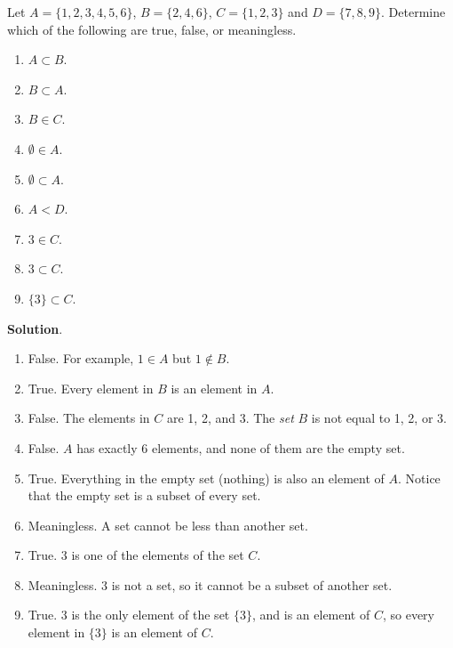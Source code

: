 \documentclass[11pt,]{book}
\theoremstyle{ptxplainnotitle}
\theoremstyle{ptxplaintitle}
\theoremstyle{ptxdefinitionnotitle}
\theoremstyle{ptxdefinitiontitle}
\theoremstyle{ptxdefinitionnotitle}
\theoremstyle{ptxdefinitiontitle}
\theoremstyle{ptxdefinitionnotitle}
\theoremstyle{ptxdefinitiontitle}
\theoremstyle{ptxdefinitiontitlenonumber}
\theoremstyle{ptxdefinitiontitlenonumber}
\numberwithin{equation}{chapter}
\newcommand{\lt}{<}
\begin{document}
\begin{example}\label{example-29}
\hypertarget{p-710}{}%
Let \(A = \{1, 2, 3, 4, 5, 6\}\), \(B = \{2, 4, 6\}\), \(C = \{1, 2, 3\}\) and \(D = \{7, 8, 9\}\). Determine which of the following are true, false, or meaningless.%
\par
\hypertarget{p-711}{}%
\leavevmode%
\begin{enumerate}
\item\hypertarget{li-288}{}\(A \subset B\).%
\item\hypertarget{li-289}{}\(B \subset A\).%
\item\hypertarget{li-290}{}\(B \in C\).%
\item\hypertarget{li-291}{}\(\emptyset \in A\).%
\item\hypertarget{li-292}{}\(\emptyset \subset A\).%
\item\hypertarget{li-293}{}\(A \lt  D\).%
\item\hypertarget{li-294}{}\(3 \in C\).%
\item\hypertarget{li-295}{}\(3 \subset C\).%
\item\hypertarget{li-296}{}\(\{3\} \subset C\).%
\end{enumerate}
%
\par\smallskip%
\noindent\textbf{Solution}.\hypertarget{solution-95}{}\quad%
\hypertarget{p-712}{}%
\leavevmode%
\begin{enumerate}
\item\hypertarget{li-297}{}\hypertarget{p-713}{}%
False. For example, \(1\in A\) but \(1 \notin B\).%
\item\hypertarget{li-298}{}\hypertarget{p-714}{}%
True. Every element in \(B\) is an element in \(A\).%
\item\hypertarget{li-299}{}\hypertarget{p-715}{}%
False. The elements in \(C\) are 1, 2, and 3. The \emph{set} \(B\) is not equal to 1, 2, or 3.%
\item\hypertarget{li-300}{}\hypertarget{p-716}{}%
False. \(A\) has exactly 6 elements, and none of them are the empty set.%
\item\hypertarget{li-301}{}\hypertarget{p-717}{}%
True. Everything in the empty set (nothing) is also an element of \(A\). Notice that the empty set is a subset of every set.%
\item\hypertarget{li-302}{}\hypertarget{p-718}{}%
Meaningless. A set cannot be less than another set.%
\item\hypertarget{li-303}{}\hypertarget{p-719}{}%
True. \(3\) is one of the elements of the set \(C\).%
\item\hypertarget{li-304}{}\hypertarget{p-720}{}%
Meaningless. \(3\) is not a set, so it cannot be a subset of another set.%
\item\hypertarget{li-305}{}\hypertarget{p-721}{}%
True. \(3\) is the only element of the set \(\{3\}\), and is an element of \(C\), so every element in \(\{3\}\) is an element of \(C\).%
\end{enumerate}
%
\end{example}
\end{document}
